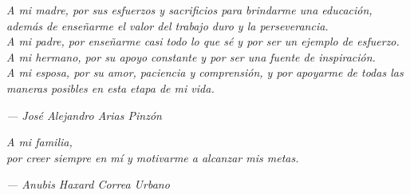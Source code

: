 \cleardoublepage{}
\thispagestyle{empty}

\vspace*{4cm}

\begin{center}
\textit{
    A mi madre, por sus esfuerzos y sacrificios para brindarme una educación, además de enseñarme el valor del trabajo duro y la perseverancia. \\
    A mi padre, por enseñarme casi todo lo que sé y por ser un ejemplo de esfuerzo. \\
    A mi hermano, por su apoyo constante y por ser una fuente de inspiración.\\
    A mi esposa, por su amor, paciencia y comprensión, y por apoyarme de todas las maneras posibles en esta etapa de mi vida.\\
}

\vspace{2cm}

\hfill \textit{--- José Alejandro Arias Pinzón}

\vspace{3cm}

\textit{
A mi familia,\\
por creer siempre en mí y motivarme a alcanzar mis metas.
}

\vspace{2cm}

\hfill \textit{--- Anubis Haxard Correa Urbano}
\end{center}
